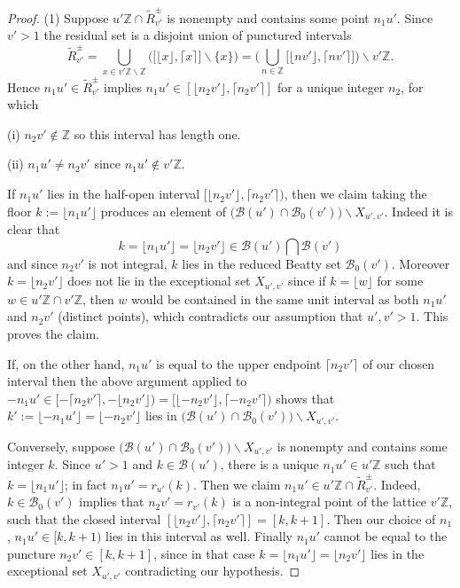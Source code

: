 \documentclass[12pt,letterpaper, reqno]{amsart}
\theoremstyle{definition}
\theoremstyle{remark}
\newcommand{\ZZ}{\ensuremath{\mathbb{Z}}}
\newcommand{\uu}{{u'}}
\newcommand{\vv}{{v'}}
\newcommand{\sB}{{\mathcal B}}
\newcommand{\floor}[1]{\lfloor{#1}\rfloor}
\newcommand{\ceil}[1]{\lceil{#1}\rceil}
\begin{document}
\begin{proof}
(1) Suppose $\uu\ZZ\cap \widetilde{R}^\pm_\vv$ is nonempty and contains some point $n_1\uu$. Since $\vv>1$ the 
residual set is a disjoint union of punctured intervals
\[ \widetilde{R}^\pm_\vv = \bigcup_{x\in {\vv}\ZZ \smallsetminus\ZZ} \bigg(\big[ \floor{x}, \ceil{x}\big] \smallsetminus\{x\} \bigg) 
=\bigg( \bigcup_{n\in \ZZ}\big[ \floor{n\vv}, \ceil{n\vv}\big] \bigg) \smallsetminus \vv\ZZ .\]
Hence $n_1\uu\in \widetilde{R}^\pm_\vv$ implies  $n_1\uu \in [\floor{n_2\vv},\ceil{n_2\vv}]$  for a unique integer $n_2$, for which

(i) $n_2\vv\not\in \ZZ$ so this interval has length one. 

(ii) $n_1\uu \neq n_2\vv$  since $n_1\uu \not\in \vv\ZZ$.

\noindent If $n_1\uu$ lies in the half-open interval $[\floor{n_2\vv},\ceil{n_2\vv})$, then we claim taking the floor $k := \floor{n_1\uu}$ produces an element of $ \big( \sB({\uu}) \cap \sB_0({\vv})\big)  \smallsetminus  X_{\uu, \vv}$. 
Indeed it is clear that 
\[ k = \floor{n_1\uu} = \floor{n_2\vv} \in \sB({\uu}) \bigcap \sB({\vv}) \]
and since $n_2\vv$ is not integral, $k$ lies in the reduced Beatty set $\sB_0({\vv})$. Moreover $k= \floor{n_2\vv}$ does not lie in the exceptional set  $X_{\uu,\vv}$ since if $k= \floor{w}$ for some $w\in \uu\ZZ\cap\vv\ZZ$, then $w$ would be contained in the same unit interval as  both $n_1\uu $ and $ n_2\vv$ (distinct points), which  contradicts our assumption that $\uu,\vv>1$. 
This proves the claim.

If, on the other hand, $n_1\uu$ is equal to the upper endpoint $\ceil{n_2\vv}$ of our chosen interval then the above argument applied to $-n_1\uu \in [ -\ceil{n_2\vv}, -\floor{n_2\vv}) = [ \floor{-n_2\vv}, \ceil{-n_2\vv})$
shows that $k' := \floor{-n_1\uu} =\floor{-n_2\vv}$ lies in $ \big( \sB({\uu}) \cap \sB_0({\vv})\big)  \smallsetminus  X_{\uu, \vv}$. 

Conversely, suppose $ \big( \sB({\uu}) \cap \sB_0({\vv})\big)  \smallsetminus  X_{\uu, \vv}$ is nonempty and contains some integer $k$. Since $\uu>1$ and $k \in\sB({\uu})$, there is a unique $n_1\uu \in \uu\ZZ$ such that $k = \floor{n_1\uu}$; in fact $n_1\uu = r_{\uu}(k)$. Then we claim
$ n_1\uu \in \uu\ZZ\cap \widetilde{R}^\pm_\vv $.
Indeed, $k\in \sB_0({\vv})$ implies that $n_2\vv = r_{\vv}(k)$ is a non-integral point of the lattice $\vv\ZZ$, such that the closed interval $[\floor{n_2\vv},\ceil{n_2\vv}] = [k, k+1]$. Then our choice of $n_1$, $n_1\uu \in [k,k+1)$ lies in this interval as well. Finally $n_1\uu$ cannot be equal to the puncture $n_2\vv \in [k,k+1]$, since in that case $k = \floor{n_1\uu} = \floor{n_2\vv}$ lies in the exceptional set $X_{\uu,\vv}$ contradicting our hypothesis.




\end{proof}
\end{document}
